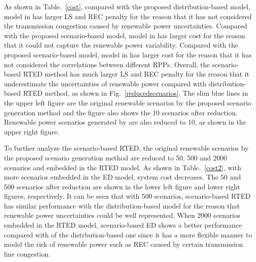 {As shown in Table.~\ref{cost}, compared with the proposed distribution-based model, model in \cite{VersatileMixture} has larger LS and REC penalty for the reason that it has not considered the transmission congestion caused by renewable power uncertainties. Compared with the proposed scenario-based model, model in \cite{copula_Zhang} has larger cost for the reason that it could not capture the renewable power variability. Compared with the proposed scenario-based model, model in \cite{sce_generation_Ma} has larger cost for the reason that it has not considered the correlations between different RPPs. Overall, the scenario-based RTED method has much larger LS and REC penalty for the reason that it underestimate the uncertainties of renewable power compared with distribution-based RTED method, as shown in Fig.~\ref{reducedscenarios}. The slim blue lines in the upper left figure are the original renewable scenarios by the proposed scenario generation method and the figure also shows the 10 scenarios after reduction. Renewable power scenarios generated by \cite{copula_Zhang} are also reduced to 10, as shown in the upper right figure.}



{To further analyze the scenario-based RTED, the original renewable scenarios by the proposed scenario generation method are reduced to 50, 500 and 2000 scenarios and embedded in the RTED model. As shown in Table.~\ref{cost2}, with more scenarios embedded in the ED model, system cost decreases. The 50 and 500 scenarios after reduction are shown in the lower left figure and lower right figures, respectively. It can be seen that with 500 scenarios, scenario-based RTED has similar performance with the distribution-based model for the reason that renewable power uncertainties could be well represented. When 2000 scenarios embedded in the RTED model, scenario-based ED shows a better performance compared with of the distrbution-based one since it has a more flexible manner to model the risk of renewable power such as REC caused by certain transmission line congestion.}





